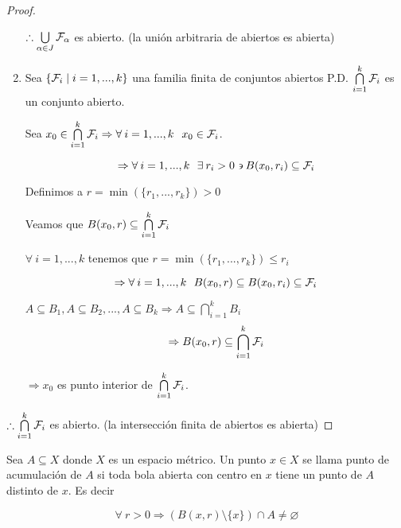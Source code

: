 \begin{proof}
\begin{enumerate}
        $\therefore \bigcup\limits_{\alpha \in J} {\mathcal{F}}_{\alpha}$ es abierto. (la unión arbitraria de abiertos es abierta)

        \item Sea  $\{ {\mathcal{F}}_{i} \mid i=1,...,k \}$  una familia finita de conjuntos abiertos P.D. $\bigcap\limits_{i=1}^{k}{\mathcal{F}}_{i}$ es un conjunto abierto. 

        Sea ${x}_{0} \in \bigcap\limits_{i=1}^{k}{\mathcal{F}}_{i} \Rightarrow \forall \: i=1,...,k$ $\: {x}_{0} \in {\ensuremath{\mathcal{F}}}_{i}$.

        \begin{equation*}
            \Rightarrow \forall \: i=1,...,k \: \: \: \exists \: {r}_{i} > 0 \backepsilon  {B}({x}_{0}, {r}_{i}) \subseteq {\ensuremath{\mathcal{F}}}_{i}
        \end{equation*}

        Definimos a $r = \min (\{ {r}_{1},...,{r}_{k} \}) > 0$

        Veamos que ${B}({x}_{0},{r}) \subseteq \bigcap\limits_{i=1}^{k}{\mathcal{F}}_{i}$

        $\forall \: i=1,...,k$ tenemos que $r = \min (\{ {r}_{1},...,{r}_{k} \}) \leq {r}_{i}$

        \begin{equation*}
             \Rightarrow \forall \: i=1,...,k \: \: \: B({x}_{0},{r}) \subseteq {B}({x}_{0}, {r}_{i}) \subseteq {\ensuremath{\mathcal{F}}}_{i}
        \end{equation*}

            $A \subseteq {B}_{1}, A \subseteq {B}_{2},...,A \subseteq {B}_{k} \Rightarrow A \subseteq \bigcap\limits_{i=1}^{k}{B}_{i}$
        \begin{equation*}
            \Rightarrow {B}({x}_{0}, {r}) \subseteq \bigcap_{i=1}^{k}{\mathcal{F}}_{i}
        \end{equation*}

        $\Rightarrow {x}_{0}$ es punto interior de $\bigcap\limits_{i=1}^{k}{\mathcal{F}}_{i}$.        
    \end{enumerate}
    
$\therefore \bigcap\limits_{i=1}^{k}{\mathcal{F}}_{i}$ es abierto. (la intersección finita de abiertos es abierta)
\end{proof}

\begin{definition} \label{def229}
    Sea $A \subseteq X$ donde $X$ es un espacio métrico. Un punto $x \in X$ se llama punto de acumulación de $A$ si toda bola abierta con centro en $x$ tiene un punto de $A$ distinto de $x$. Es decir

    \begin{equation*}
        \forall \: r > 0 \Rightarrow (B(x,r) \setminus \{ x \}) \cap A \neq \varnothing
    \end{equation*}
\end{definition}


